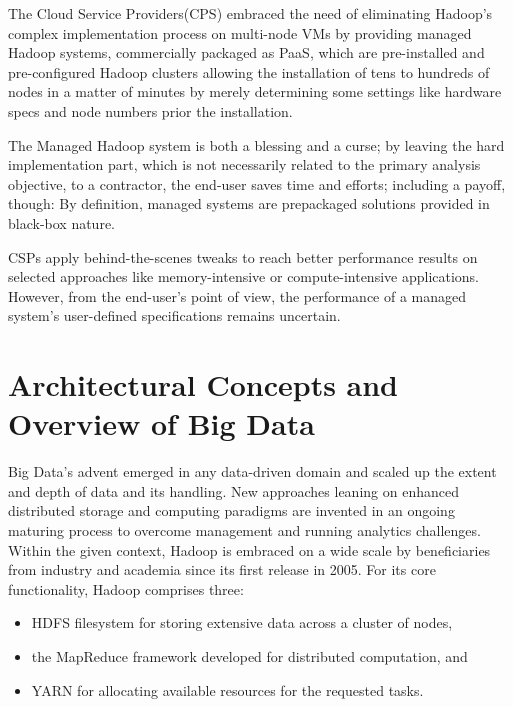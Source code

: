 \documentclass[review]{elsarticle}
\begin{document}
	The Cloud Service Providers(CPS) embraced the need of eliminating Hadoop's complex implementation process on multi-node VMs by providing managed Hadoop systems, commercially packaged as PaaS, which are pre-installed and pre-configured Hadoop clusters allowing the installation of tens to hundreds of nodes in a matter of minutes by merely determining some settings like hardware specs and node numbers prior the installation. 
	
	The Managed Hadoop system is both a blessing and a curse; by leaving the hard implementation part, which is not necessarily related to the primary analysis objective, to a contractor, the end-user saves time and efforts; including a payoff, though: By definition, managed systems are prepackaged solutions provided in black-box nature. 
	
	CSPs apply behind-the-scenes tweaks to reach better performance results on selected approaches like memory-intensive or compute-intensive applications. However, from the end-user's point of view, the performance of a managed system's user-defined specifications remains uncertain.
	
	
	\section{Architectural Concepts and Overview of Big Data} 	\label{sec:Background}
	
	Big Data's advent emerged in any data-driven domain and scaled up the extent and depth of data and its handling. New approaches leaning on enhanced distributed storage and computing paradigms are invented in an ongoing maturing process to overcome management and running analytics challenges. Within the given context, Hadoop is embraced on a wide scale by beneficiaries from industry and academia since its first release in 2005.
	For its core functionality, Hadoop comprises three:
	
	\begin{itemize}
		\item HDFS filesystem for storing extensive data across a cluster of nodes,
		\item the MapReduce framework developed for distributed computation, and 
		\item YARN for allocating available resources for the requested tasks.
	\end{itemize}
	
\end{document}
